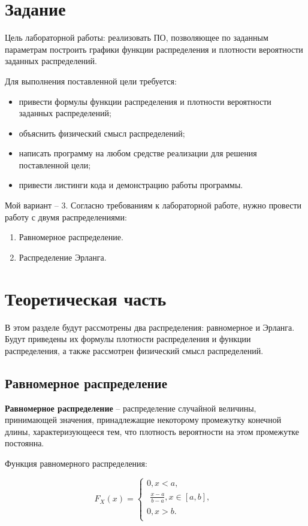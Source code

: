 \chapter{Задание}

Цель лабораторной работы: реализовать ПО, позволяющее по заданным параметрам построить графики функции распределения и плотности вероятности заданных распределений.

Для выполнения поставленной цели требуется:
\begin{itemize}
	\item привести формулы функции распределения и плотности вероятности заданных распределений;
	\item объяснить физический смысл распределений;
	\item написать программу на любом средстве реализации для решения поставленной цели;
	\item привести листинги кода и демонстрацию работы программы.
\end{itemize}

Мой вариант -- 3.
Согласно требованиям к лабораторной работе, нужно провести работу с двумя распределениями:
\begin{enumerate}
	\item Равномерное распределение.
	\item Распределение Эрланга.
\end{enumerate}

\chapter{Теоретическая часть}
В этом разделе будут рассмотрены два распределения: равномерное и Эрланга. Будут приведены их формулы плотности распределения и функции распределения, а также рассмотрен физический смысл распределений.
\section{Равномерное распределение}
\textbf{Равномерное распределение} -- распределение случайной величины, принимающей значения, принадлежащие некоторому промежутку конечной длины, характеризующееся тем, что плотность вероятности на этом промежутке постоянна.

Функция равномерного распределения:

\begin{equation}
    F_X(x) =
    \begin{cases}
            0, x < a, \\
            \begin{aligned}
                \frac{x -  a}{b - a}, x \in [a, b], 
            \end{aligned}\\
            0, x > b. \\
    \end{cases}
\end{equation}

